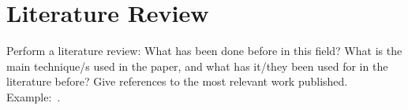 
\section{Literature Review} \label{sec:lit}

Perform a literature review: What has been done before in this field? What is the main technique/s used in the paper, and what has it/they been used for in the literature before? Give references to the most relevant work published. Example:~\cite{Browne2012}.